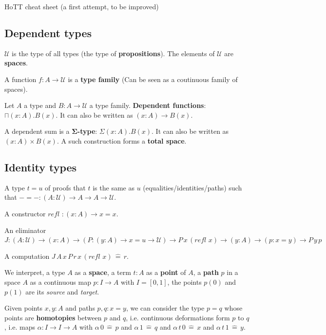 \documentclass[a4paper]{article}
\begin{document}
\begin{center}
  \Large HoTT cheat sheet (a first attempt, to be improved)
\end{center}

\subsection*{Dependent types}

$\mathcal{U}$ is the type of all types (the type of \textbf{propositions}). The elements of $\mathcal{U}$ are \textbf{spaces}.

A function $f: A \to \mathcal{U}$ is a \textbf{type family} (Can be seen as a coutinuous family of spaces).

Let $A$ a type and $B: A \to \mathcal{U}$ a type family. \textbf{Dependent functions}: $\sqcap (x:A).B(x)$. It can also be written as $(x:A) \to B(x)$.

A dependent sum is a $\bm{\Sigma}$\textbf{-type}: $\Sigma(x:A).B(x)$. It can also be written as $(x:A) \times B(x)$. A such construction forms a \textbf{total space}.

\subsection*{Identity types}

A type $t = u$ of proofs that $t$ is the same as $u$ (equalities/identities/paths) such that $- = - : (A : \mathcal{U}) \to A \to A \to \mathcal{U}$.

A constructor $\textit{refl } : (x : A) \to x = x$.

An eliminator $J : (A : \mathcal{U}) \to (x : A) \to (P : (y : A) \to x = u \to \mathcal{U}) \to P \, x \, (\textit{refl } x) \to (y : A) \to (p : x = y) \to P \, y \, p$

A computation $J \, A \, x \, P \, r \, x \, (\textit{refl } x) \, \hat{=} \, r$.

We interpret, a type $A$ as a \textbf{space}, a term $t : A$ as a \textbf{point} of $A$, a \textbf{path} $p$ in a space $A$ as a continuous map $p : I \to A$ with $I = [0,1]$, the points $p(0)$ and $p(1)$ are its \textit{source} and \textit{target}.

Given points $x,y:A$ and paths $p,q: x=y$, we can consider the type $p=q$ whose points are \textbf{homotopies} between $p$ and $q$, i.e. continuous deformations form $p$ to $q$, i.e. maps $\alpha : I \to I \to A$ with $\alpha \, 0 \, \hat{=} \, p$ and $\alpha \, 1 \, \hat{=} \, q$ and $\alpha \, t \, 0 \, \hat{=} \, x$ and $\alpha \, t \, 1 \, \hat{=} \, y$.
\end{document}
